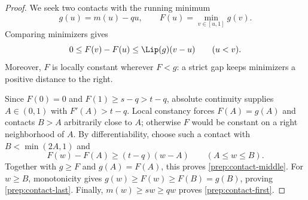 \begin{proof}
We seek two contacts with the running minimum
\[
g(u)=m(u)-qu,\qquad F(u)=\min_{v\in[u,1]}g(v).
\]
Comparing minimizers gives
\[
0\le F(v)-F(u)\le \Lip(g)(v-u)\qquad(u<v).
\]
Moreover, $F$ is locally constant wherever $F<g$: a strict gap keeps minimizers a positive distance to the right.

Since $F(0)=0$ and $F(1)\ge s-q>t-q$, absolute continuity supplies $A\in(0,1)$ with $F'(A)>t-q$. Local constancy forces $F(A)=g(A)$ and contacts $B>A$ arbitrarily close to $A$; otherwise $F$ would be constant on a right neighborhood of $A$. By differentiability, choose such a contact with $B<\min(2A,1)$ and
\[
F(w)-F(A)\ge(t-q)(w-A)\qquad(A\le w\le B).
\]
Together with $g\ge F$ and $g(A)=F(A)$, this proves \eqref{prep:contact-middle}. For $w\ge B$, monotonicity gives $g(w)\ge F(w)\ge F(B)=g(B)$, proving \eqref{prep:contact-last}. Finally, $m(w)\ge sw\ge qw$ proves \eqref{prep:contact-first}.
\end{proof}

